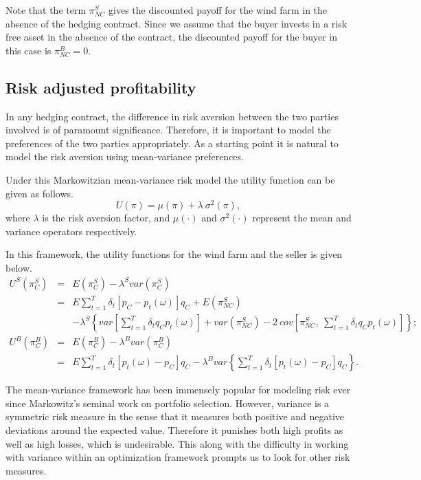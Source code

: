 Note that the term $\pi^S_{NC}$ gives the discounted payoff for the wind farm in the absence of the hedging contract. Since we assume that the buyer invests in a risk free asset in the absence of the contract, the discounted payoff for the buyer in this case is $\pi_{NC}^B = 0$.

\subsection{Risk adjusted profitability}

In any hedging contract, the difference in risk aversion between the two parties involved is of paramount significance. Therefore, it is important to model the preferences of the two parties appropriately. As a starting point it is natural to model the risk aversion using mean-variance preferences.

Under this Markowitzian mean-variance risk model the utility function can be given as follows.
\begin{equation*}
	U(\pi) = \mu(\pi) + \lambda \ \sigma^2(\pi),
\end{equation*}
\noindent where $\lambda$ is the risk aversion factor, and $\mu(\cdot)$ and $\sigma^2(\cdot)$ represent the mean and variance operators respectively.

In this framework, the utility functions for the wind farm and the seller is given below.
\begin{equation}\label{eq:SellerUC}
\begin{array}{rcl}
U^S(\pi_C^S) & = & E(\pi_C^S) - \lambda^S var(\pi_C^S) \\
& = &  E \displaystyle \sum_{t=1}^T \delta_t \left[p_C - p_t(\omega) \right]q_C + E(\pi^S_{NC}) \\
&    &  - \lambda^S\left\{var\left[\displaystyle \sum_{t=1}^T \delta_tq_Cp_t(\omega)\right]  + var(\pi^S_{NC})
- 2 \  cov \left[\pi^S_{NC},\ \displaystyle \sum_{t=1}^T \delta_tq_Cp_t(\omega) \right]\right\}; \\[20pt]
U^B(\pi^B_C) & = & E(\pi^B_C) - \lambda^B var(\pi^B_C)\\
& = & E\displaystyle \sum_{t=1}^T \delta_t \left[p_t(\omega) - p_C\right]q_C - \lambda^B var\left\{\displaystyle \sum_{t=1}^T \delta_t \left[p_t(\omega) - p_C\right]q_C\right\}. 
\end{array}
\end{equation}

\noindent The mean-variance framework has been immensely popular for modeling risk ever since Markowitz's seminal work on portfolio selection. However, variance is a symmetric risk measure in the sense that it measures both positive and negative deviations around the expected value. Therefore it punishes both high profits as well as high losses, which is undesirable. This along with the difficulty in working with variance within an optimization framework prompts us to look for other risk measures. 

